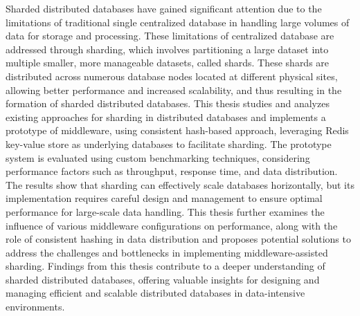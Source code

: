 Sharded distributed databases have gained significant attention due to the limitations of traditional single centralized database in handling large volumes of data for storage and processing. These limitations of centralized database are addressed through sharding, which involves partitioning a large dataset into multiple smaller, more manageable datasets, called shards. These shards are distributed across numerous database nodes located at different physical sites, allowing better performance and increased scalability, and thus resulting in the formation of sharded distributed databases. This thesis studies and analyzes existing approaches for sharding in distributed databases and implements a prototype of middleware, using consistent hash-based approach, leveraging Redis key-value store as underlying databases to facilitate sharding. The prototype system is evaluated using custom benchmarking techniques, considering performance factors such as throughput, response time, and data distribution. The results show that sharding can effectively scale databases horizontally, but its implementation requires careful design and management to ensure optimal performance for large-scale data handling. This thesis further examines the influence of various middleware configurations on performance, along with the role of consistent hashing in data distribution and proposes potential solutions to address the challenges and bottlenecks in implementing middleware-assisted sharding. Findings from this thesis contribute to a deeper understanding of sharded distributed databases, offering valuable insights for designing and managing efficient and scalable distributed databases in data-intensive environments.


\vfill

\endgroup

\vfill
